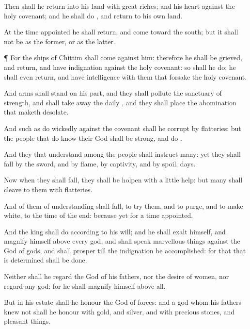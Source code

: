 {Then shall he
return into his
land with
great
riches; and his
heart
{} against the
holy
covenant; and he shall
do
{}, and
return to his own
land.

At the time
appointed he shall
return, and
come toward the
south; but it shall not be as the
former, or as the
latter.


\par }{\PP {}¶ For the
ships of
Chittim shall
come against him: therefore he shall be
grieved, and
return, and have
indignation against the
holy
covenant: so shall he
do; he shall even
return, and have
intelligence with them that
forsake the
holy
covenant.

And
arms shall
stand on his part, and they shall
pollute the
sanctuary of
strength, and shall take
away the
daily
{}, and they shall
place the
abomination that maketh
desolate.

And such as do
wickedly against the
covenant shall he
corrupt by
flatteries: but the
people that do
know their
God shall be
strong, and
do
{}.

And they that
understand among the
people shall
instruct
many: yet they shall
fall by the
sword, and by
flame, by
captivity, and by
spoil,
{}
days.

Now when they shall
fall, they shall be
holpen with a
little
help: but
many shall
cleave to them with
flatteries.

And
{} of them of
understanding shall
fall, to
try them, and to
purge, and to make
{}
white,
{} to the
time of the
end: because
{} yet for a time
appointed.

And the
king shall
do according to his
will; and he shall
exalt himself, and
magnify himself above every
god, and shall
speak marvellous
things against the
God of
gods, and shall
prosper till the
indignation be
accomplished: for that that is
determined shall be
done.

Neither shall he
regard the
God of his
fathers, nor the
desire of
women, nor
regard any
god: for he shall
magnify himself above all.

But in his
estate shall he
honour the
God of
forces: and a
god whom his
fathers
knew not shall he
honour with
gold, and
silver, and with
precious
stones, and pleasant
things.

}

